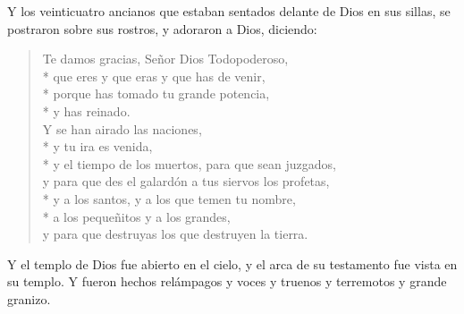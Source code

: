 Y los veinticuatro ancianos que estaban sentados delante de Dios en sus sillas, se postraron sobre sus rostros, y adoraron a Dios, 
diciendo:
\begin{verse}
Te damos gracias, Señor Dios Todopoderoso,\\*\vin
que eres y que eras y que has de venir,\\*
porque has tomado tu grande potencia,\\*\vin
y has reinado.\\ 
Y se han airado las naciones,\\*\vin
y tu ira es venida,\\*\vin
y el tiempo de los muertos, para que sean juzgados,\\
y para que des el galardón a tus siervos los profetas,\\*\vin
y a los santos, y a los que temen tu nombre,\\*\vin
a los pequeñitos y a los grandes,%
	\\
y para que destruyas los que destruyen la tierra.%
\end{verse}
Y el templo de Dios fue abierto en el cielo, y el arca de su testamento fue vista en su templo. Y fueron hechos relámpagos y voces y truenos y terremotos y grande granizo.%
